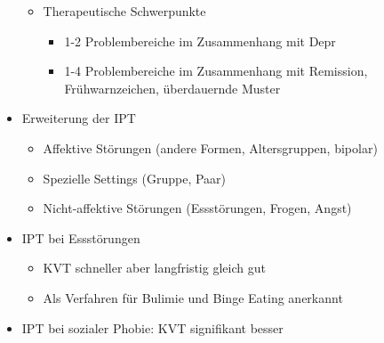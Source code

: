 \documentclass[11pt, paper=a4, twocolumn]{scrartcl}
\begin{document}
\begin{itemize}
\begin{itemize}
					\item Therapeutische Schwerpunkte
						\begin{itemize} 
							\item 1-2 Problembereiche im Zusammenhang mit Depr
							\item 1-4 Problembereiche im Zusammenhang mit Remission, Frühwarnzeichen, überdauernde Muster
						\end{itemize}
				\end{itemize}
			\item Erweiterung der IPT
				\begin{itemize}
					\item Affektive Störungen (andere Formen, Altersgruppen, bipolar)
					\item Spezielle Settings (Gruppe, Paar)
					\item Nicht-affektive Störungen (Essstörungen, Frogen, Angst)
				\end{itemize}
			\item IPT bei Essstörungen
				\begin{itemize}
					\item KVT schneller aber langfristig gleich gut
					\item Als Verfahren für Bulimie und Binge Eating anerkannt
				\end{itemize}
			\item IPT bei sozialer Phobie: KVT signifikant besser
		\end{itemize}
\end{document}
